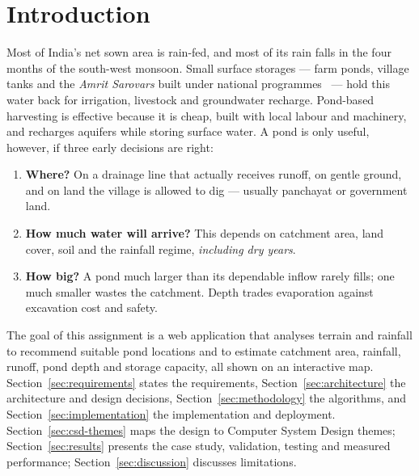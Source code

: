 \documentclass[manuscript,screen,review]{acmart}
\begin{document}
\noindent{}

\section{Introduction}
\label{sec:intro}
Most of India's net sown area is rain-fed, and most of its rain falls in the four months of
the south-west monsoon. Small surface storages --- farm ponds, village tanks and the
\emph{Amrit Sarovars} built under national programmes~\cite{amritsarovar} --- hold this water
back for irrigation, livestock and groundwater recharge. Pond-based harvesting is effective
because it is cheap, built with local labour and machinery, and recharges aquifers while
storing surface water. A pond is only useful, however, if three early decisions are right:
\begin{enumerate}
  \item \textbf{Where?} On a drainage line that actually receives runoff, on gentle ground,
    and on land the village is allowed to dig --- usually panchayat or government land.
  \item \textbf{How much water will arrive?} This depends on catchment area, land cover, soil
    and the rainfall regime, \emph{including dry years}.
  \item \textbf{How big?} A pond much larger than its dependable inflow rarely fills; one much
    smaller wastes the catchment. Depth trades evaporation against excavation cost and safety.
\end{enumerate}

The goal of this assignment is a web application that analyses terrain and rainfall to
recommend suitable pond locations and to estimate catchment area, rainfall, runoff, pond depth
and storage capacity, all shown on an interactive map. Section~\ref{sec:requirements} states
the requirements, Section~\ref{sec:architecture} the architecture and design decisions,
Section~\ref{sec:methodology} the algorithms, and Section~\ref{sec:implementation} the
implementation and deployment. Section~\ref{sec:csd-themes} maps the design to Computer System
Design themes; Section~\ref{sec:results} presents the case study, validation, testing and
measured performance; Section~\ref{sec:discussion} discusses limitations.
\end{document}

